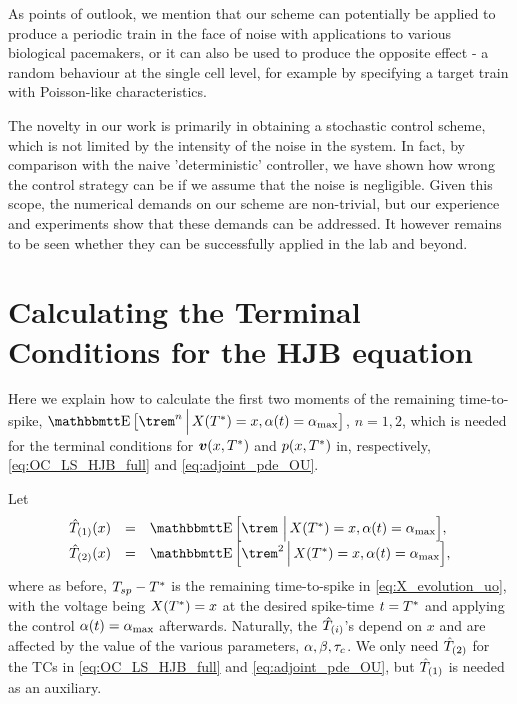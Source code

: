 
As points of outlook, we mention that our scheme can potentially be applied to
produce a periodic train in the face of noise with applications to various
biological pacemakers, or it can also be used to produce the opposite effect - a
random behaviour at the single cell level, for example by specifying a target
train with Poisson-like characteristics.

The novelty in our work is primarily in obtaining a stochastic control scheme,
which is not limited by the intensity of the noise in the system. In fact, by
comparison with the naive 'deterministic' controller, we have shown how wrong
the control strategy can be if we assume that the noise is negligible. Given
this scope, the numerical demands on our scheme are non-trivial, but our
experience and experiments show that these demands can be addressed.
It however remains to be seen whether they can be successfully applied in the lab
and beyond.


\section{Calculating the Terminal Conditions for the HJB equation}
\label{sec:valuefun_TCs}
Here we explain how to calculate the first two moments of the remaining
time-to-spike, $\Exp \big[\trem^n \,\Big|\, X(\T) = x, \a(t) = \amax
\big]$, $n=1,2$, which is needed for the terminal conditions for ${ \boldsymbol{v} }(x,{ T^* })$
and $p(x,{ T^* })$ in, respectively, \cref{eq:OC_LS_HJB_full} and
\cref{eq:adjoint_pde_OU}.

Let
\begin{equation}
\begin{array}{lcl}
\Tone(x) &=& \Exp \Big[\trem \,\,\Big|\, X(\T) = x, \a(t) = \amax
\Big],
\\
\Ttwo(x) &=&
\Exp \Big[\trem^2 \,\Big|\, X(\T) = x, \a(t) = \amax \Big],
\end{array}
\end{equation}
where as before, $T_{sp}-{ T^* }$ is the remaining time-to-spike in
\cref{eq:X_evolution_uo}, with the voltage being $X({ T^* }) = x$ at the desired
spike-time $t={ T^* }$ and applying the control $\alpha(t) = { \alpha_{\textrm{max}} }$ afterwards.
Naturally, the ${ \hat{T}_{(i)} }$'s depend on $x$ and are affected by the value of the
various parameters, $\alpha,\beta,\tau_c$. We only  need ${ \hat{T}_{(2)} }$ for the TCs in
\cref{eq:OC_LS_HJB_full} and \cref{eq:adjoint_pde_OU}, but ${ \hat{T}_{(1)} }$ is needed as
an auxiliary. 
  
